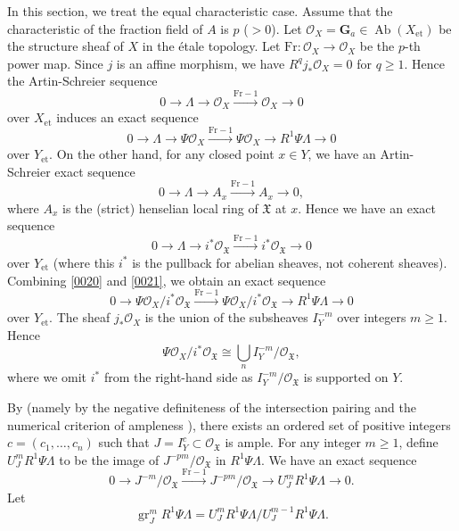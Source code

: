 \documentclass{amsart}
\theoremstyle{remark}
\numberwithin{equation}{section}
\newcommand{\Order}{\mathcal{O}}
\newcommand{\et}{\mathrm{et}}
\newcommand{\Ga}{\mathbf{G}_{a}}
\newcommand{\Frob}{\mathrm{Fr}}
\DeclareMathOperator{\Ab}{Ab}
\DeclareMathOperator{\gr}{gr}
\begin{document}
In this section, we treat the equal characteristic case.
Assume that the characteristic of the fraction field of $A$ is $p$ ($> 0$).
Let $\Order_{X} = \Ga \in \Ab(X_{\et})$ be
the structure sheaf of $X$ in the \'etale topology.
Let $\Frob \colon \Order_{X} \to \Order_{X}$ be the $p$-th power map.
Since $j$ is an affine morphism,
we have $R^{q} j_{\ast} \Order_{X} = 0$ for $q \ge 1$.
Hence the Artin-Schreier sequence
	\[
		0 \to \Lambda \to \Order_{X} \stackrel{\Frob - 1}{\to} \Order_{X} \to 0
	\]
over $X_{\et}$ induces an exact sequence
	\begin{equation} \label{0020}
			0
		\to
			\Lambda
		\to
			\Psi \Order_{X}
		\stackrel{\Frob - 1}{\to}
			\Psi \Order_{X}
		\to
			R^{1} \Psi \Lambda
		\to
			0
	\end{equation}
over $Y_{\et}$.
On the other hand, for any closed point $x \in Y$,
we have an Artin-Schreier exact sequence
	\[
			0
		\to
			\Lambda
		\to
			A_{x}
		\stackrel{\Frob - 1}{\to}
			A_{x}
		\to
			0,
	\]
where $A_{x}$ is the (strict) henselian local ring of $\mathfrak{X}$ at $x$.
Hence we have an exact sequence
	\begin{equation} \label{0021}
			0
		\to
			\Lambda
		\to
			i^{\ast} \Order_{\mathfrak{X}}
		\stackrel{\Frob - 1}{\to}
			i^{\ast} \Order_{\mathfrak{X}}
		\to
			0
	\end{equation}
over $Y_{\et}$ (where this $i^{\ast}$ is the pullback for abelian sheaves, not coherent sheaves).
Combining \eqref{0020} and \eqref{0021},
we obtain an exact sequence
	\[
			0
		\to
			\Psi \Order_{X} / i^{\ast} \Order_{\mathfrak{X}}
		\stackrel{\Frob - 1}{\to}
			\Psi \Order_{X} / i^{\ast} \Order_{\mathfrak{X}}
		\to
			R^{1} \Psi \Lambda
		\to
			0
	\]
over $Y_{\et}$.
The sheaf $j_{\ast} \Order_{X}$ is the union of the subsheaves
$I_{Y}^{- m}$ over integers $m \ge 1$.
Hence
	\[
			\Psi \Order_{X} / i^{\ast} \Order_{\mathfrak{X}}
		\cong
			\bigcup_{n}
				I_{Y}^{- m} / \Order_{\mathfrak{X}},
	\]
where we omit $i^{\ast}$ from the right-hand side
as $I_{Y}^{- m} / \Order_{\mathfrak{X}}$ is supported on $Y$.

By \cite[Lemma (4.5)]{Sai87}
(namely by the negative definiteness of the intersection pairing
and the numerical criterion of ampleness \cite[Theorem (12.1) (iii)]{Lip69}),
there exists an ordered set of positive integers $c = (c_{1}, \dots, c_{n})$
such that $J = I_{Y}^{c} \subset \Order_{\mathfrak{X}}$ is ample.
For any integer $m \ge 1$, define $U_{J}^{m} R^{1} \Psi \Lambda$ to be
the image of $J^{- p m} / \Order_{\mathfrak{X}}$ in $R^{1} \Psi \Lambda$.
We have an exact sequence
	\begin{equation} \label{0024}
			0
		\to
			J^{- m} / \Order_{\mathfrak{X}}
		\stackrel{\Frob - 1}{\to}
			J^{- p m} / \Order_{\mathfrak{X}}
		\to
			U_{J}^{m} R^{1} \Psi \Lambda
		\to
			0.
	\end{equation}
Let
	\[
			\gr_{J}^{m} R^{1} \Psi \Lambda
		=
				U_{J}^{m} R^{1} \Psi \Lambda
			/
				U_{J}^{m - 1} R^{1} \Psi \Lambda.
	\]
\end{document}
